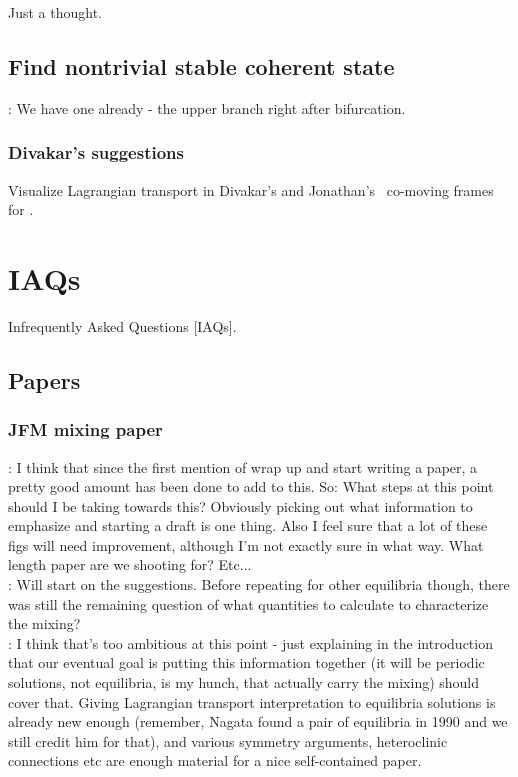 Just a thought.


\section{Find nontrivial stable coherent state}

: We have one already -
the upper branch right after bifurcation.

\subsection{Divakar's suggestions}

Visualize Lagrangian transport in Divakar's and Jonathan's \rpo\
co-moving frames for \pCf.



\chapter{IAQs}      \label{IAQs}

Infrequently Asked Questions [IAQs].

\section{Papers}

\subsection{JFM mixing paper }

 :
 I think that since the first mention of wrap up and start writing a
 paper, a pretty good amount has been done to add to this. So: What
 steps at this point should I be taking towards this? Obviously
 picking out what information to emphasize and starting a draft is one
 thing. Also I feel sure that a lot of these figs will need
 improvement, although I'm not exactly sure in what way. What length
 paper are we shooting for? Etc... \\

 :
Will start on the suggestions. Before repeating for other equilibria
though, there was still the remaining question of what quantities to
calculate to characterize the mixing?\\

 :
I think that's too ambitious at this point - just explaining in the
introduction that our eventual goal is putting this information
together (it will be periodic solutions, not equilibria, is my
hunch, that actually carry the mixing) should cover that. Giving
Lagrangian transport interpretation to equilibria solutions is
already new enough (remember, Nagata found a pair of equilibria in
1990 and we still credit him for that), and various symmetry
arguments, heteroclinic connections etc are enough material for a
nice self-contained paper.\\

